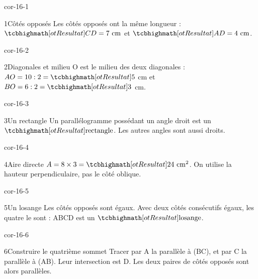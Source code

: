 \clearpage\pagestyle{otMain}\setlength{\otBlocEspacement}{2.5mm}\fontsize{11}{15}\selectfont{}
\begin{blocLivre}{cor-16-1}\begin{corrige}{1}{Côtés opposés}
Les côtés opposés ont la même longueur : $\res{CD=7\ \mathrm{cm}}$ et $\res{AD=4\ \mathrm{cm}}$.
\label{fig-cor-16-1}
\end{corrige}\end{blocLivre}
\begin{blocLivre}{cor-16-2}\begin{corrige}{2}{Diagonales et milieu}
O est le milieu des deux diagonales : $AO=10:2=\res5$ cm et $BO=6:2=\res3$ cm.
\label{fig-cor-16-2}
\end{corrige}\end{blocLivre}
\begin{blocLivre}{cor-16-3}\begin{corrige}{3}{Un rectangle}
Un parallélogramme possédant un angle droit est un $\res{\text{rectangle}}$. Les autres angles sont aussi droits.
\label{fig-cor-16-3}
\end{corrige}\end{blocLivre}
\begin{blocLivre}{cor-16-4}\begin{corrige}{4}{Aire directe}
$A=8\times3=\res{24\ \mathrm{cm}^2}$. On utilise la hauteur perpendiculaire, pas le côté oblique.
\label{fig-cor-16-4}
\end{corrige}\end{blocLivre}
\begin{blocLivre}{cor-16-5}\begin{corrige}{5}{Un losange}
Les côtés opposés sont égaux. Avec deux côtés consécutifs égaux, les quatre le sont : ABCD est un $\res{\text{losange}}$.
\label{fig-cor-16-5}
\end{corrige}\end{blocLivre}
\begin{blocLivre}{cor-16-6}\begin{corrige}{6}{Construire le quatrième sommet}
Tracer par A la parallèle à (BC), et par C la parallèle à (AB). Leur intersection est D. Les deux paires de côtés opposés sont alors parallèles.
\label{fig-cor-16-6}
\end{corrige}\end{blocLivre}
